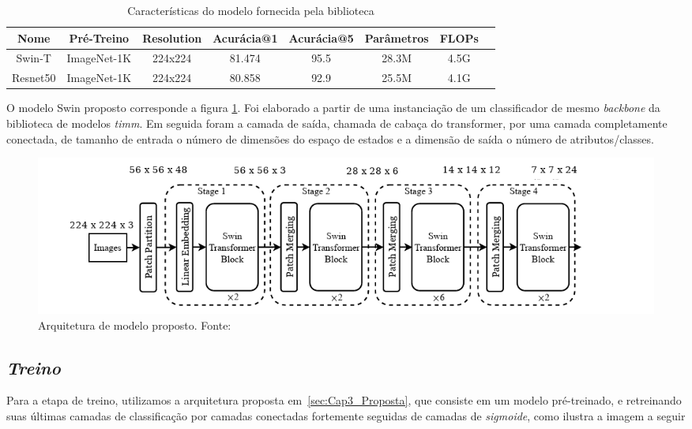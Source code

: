 \begin{table}[h!]
    \caption{Características do modelo fornecida pela biblioteca } 
    \centering
\begin{tabular}{*{8}{c}}
    \toprule
    Nome & Pré-Treino & Resolution & Acurácia@1 & Acurácia@5 &  Parâmetros & FLOPs \\
    \midrule
    Swin-T & ImageNet-1K & 224x224 & 81.474 & 95.5 &	28.3M &	4.5G \\
    Resnet50 & ImageNet-1K & 224x224 &	80.858 & 92.9 &	25.5M &	4.1G \\
    \bottomrule
\end{tabular}
\label{tab:especificacao_modelos}
\end{table}


O modelo Swin proposto corresponde a figura \ref{fig:Swin-T-Rsp}. Foi elaborado a partir de uma instanciação de um classificador de mesmo \textit{backbone} da biblioteca de modelos \textit{timm}. Em seguida foram a camada de saída, chamada de cabaça do transformer, por uma camada completamente conectada, de tamanho de entrada o número de dimensões do espaço de estados e a dimensão de saída o número de atributos/classes.

\begin{figure}[!ht]
    \centering
    \includegraphics[width=0.9\columnwidth]{Imagens/swin proposto.png}
    \caption{ Arquitetura de modelo proposto.
    Fonte: \cite{liu2022swin}}
   \label{fig:Swin-T-Rsp}
\end{figure}



\subsection{\textit{Treino}}\label{sec:Cap3_Treino}

Para a etapa de treino, utilizamos a arquitetura proposta em~\ref{sec:Cap3_Proposta}, que consiste em um modelo pré-treinado, e retreinando suas últimas camadas de classificação por camadas conectadas fortemente seguidas de camadas de \textit{sigmoide}, como ilustra a imagem a seguir


